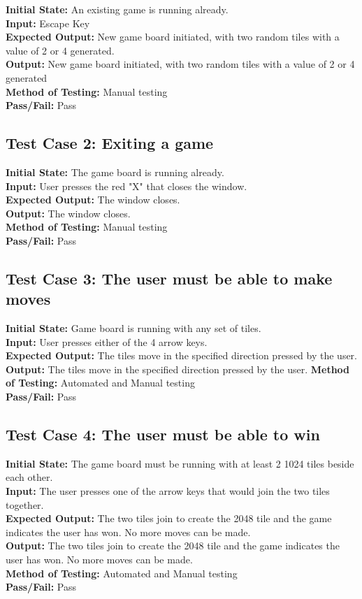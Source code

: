 \documentclass[12pt]{article}
\begin{document}
\textbf{Initial State:} An existing game is running already. \\
\textbf{Input:} Escape Key\\
\textbf{Expected Output:} New game board initiated, with two random tiles with a value of 2 or 4 generated. \\
\textbf{Output:} New game board initiated, with two random tiles with a value of 2 or 4 generated \\
\textbf{Method of Testing:} Manual testing\\
\textbf{Pass/Fail:} Pass

\subsection{Test Case 2: Exiting a game}

\textbf{Initial State:} The game board is running already.\\
\textbf{Input:} User presses the red "X" that closes the window.\\
\textbf{Expected Output:} The window closes.\\
\textbf{Output:} The window closes. \\
\textbf{Method of Testing:} Manual testing\\
\textbf{Pass/Fail:} Pass

\subsection{Test Case 3: The user must be able to make moves}

\textbf{Initial State:} Game board is running with any set of tiles.\\
\textbf{Input:} User presses either of the 4 arrow keys.\\
\textbf{Expected Output:} The tiles move in the specified direction pressed by the user.\\
\textbf{Output:} The tiles move in the specified direction pressed by the user.
\textbf{Method of Testing:} Automated and Manual testing\\
\textbf{Pass/Fail:} Pass

\subsection{Test Case 4: The user must be able to win}

\textbf{Initial State:} The game board must be running with at least 2 1024 tiles beside
each other.\\
\textbf{Input:} The user presses one of the arrow keys that would join the two tiles together.\\
\textbf{Expected Output:} The two tiles join to create the 2048 tile and the game indicates the user has won. No more moves can be made.\\
\textbf{Output:} The two tiles join to create the 2048 tile and the game indicates the user has won. No more moves can be made.\\
\textbf{Method of Testing:} Automated and Manual testing\\
\textbf{Pass/Fail:} Pass
\end{document}
